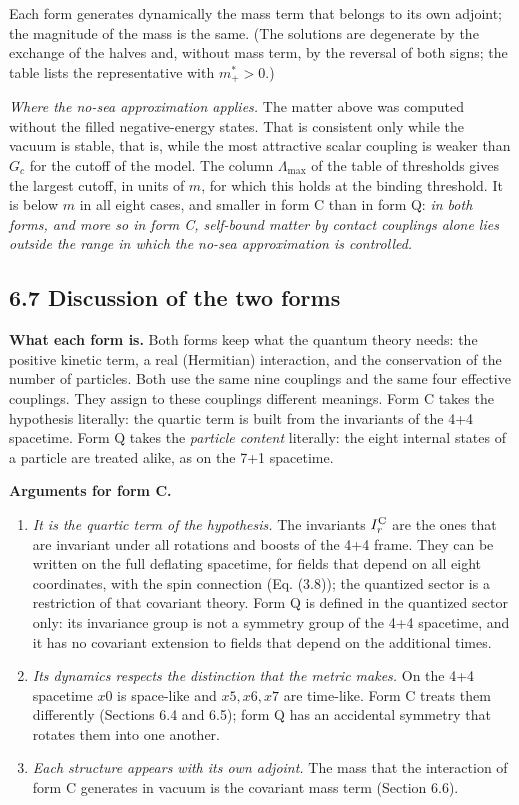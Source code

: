 \documentclass[
  10pt,
]{article}
\providecommand{\tightlist}{%
  \setlength{\itemsep}{0pt}\setlength{\parskip}{0pt}}
\begin{document}
Each form generates dynamically the mass term that belongs to its own
adjoint; the magnitude of the mass is the same. (The solutions are
degenerate by the exchange of the halves and, without mass term, by the
reversal of both signs; the table lists the representative with
\(m^*_+>0\).)

\emph{Where the no-sea approximation applies.} The matter above was
computed without the filled negative-energy states. That is consistent
only while the vacuum is stable, that is, while the most attractive
scalar coupling is weaker than \(G_c\) for the cutoff of the model. The
column \(\Lambda_{\max}\) of the table of thresholds gives the largest
cutoff, in units of \(m\), for which this holds at the binding
threshold. It is below \(m\) in all eight cases, and smaller in form C
than in form Q: \emph{in both forms, and more so in form C, self-bound
matter by contact couplings alone lies outside the range in which the
no-sea approximation is controlled.}

\hypertarget{discussion-of-the-two-forms}{%
\subsection{6.7 Discussion of the two
forms}\label{discussion-of-the-two-forms}}

\textbf{What each form is.} Both forms keep what the quantum theory
needs: the positive kinetic term, a real (Hermitian) interaction, and
the conservation of the number of particles. Both use the same nine
couplings and the same four effective couplings. They assign to these
couplings different meanings. Form C takes the hypothesis literally: the
quartic term is built from the invariants of the 4+4 spacetime. Form Q
takes the \emph{particle content} literally: the eight internal states
of a particle are treated alike, as on the 7+1 spacetime.

\textbf{Arguments for form C.}

\begin{enumerate}
\def\labelenumi{\arabic{enumi}.}
\tightlist
\item
  \emph{It is the quartic term of the hypothesis.} The invariants
  \(I_r^{\rm C}\) are the ones that are invariant under all rotations
  and boosts of the 4+4 frame. They can be written on the full deflating
  spacetime, for fields that depend on all eight coordinates, with the
  spin connection (Eq. (3.8)); the quantized sector is a restriction of
  that covariant theory. Form Q is defined in the quantized sector only:
  its invariance group is not a symmetry group of the 4+4 spacetime, and
  it has no covariant extension to fields that depend on the additional
  times.
\item
  \emph{Its dynamics respects the distinction that the metric makes.} On
  the 4+4 spacetime \(x0\) is space-like and \(x5,x6,x7\) are time-like.
  Form C treats them differently (Sections 6.4 and 6.5); form Q has an
  accidental symmetry that rotates them into one another.
\item
  \emph{Each structure appears with its own adjoint.} The mass that the
  interaction of form C generates in vacuum is the covariant mass term
  (Section 6.6).
\end{enumerate}
\end{document}
